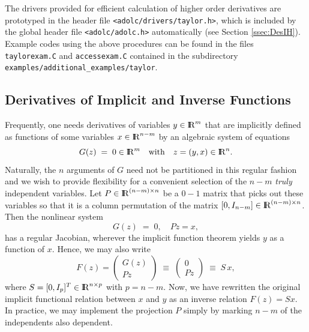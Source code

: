 \documentclass[11pt,twoside]{article}
\newcommand{\R}{{ {\rm I} \kern -.225em {\rm R} }}
\begin{document}
The drivers provided for efficient calculation of higher order
derivatives are prototyped in the header file \verb=<adolc/drivers/taylor.h>=,
which is included by the global header file \verb=<adolc/adolc.h>= automatically
(see Section \ref{ssec:DesIH}).
Example codes using the above procedures can be found in the files
\verb=taylorexam.C= and \verb=accessexam.C= contained in the subdirectory
\verb=examples/additional_examples/taylor=.
%
\subsection{Derivatives of Implicit and Inverse Functions}
\label{implicitInverse}
%
Frequently, one needs derivatives of variables
$y \in \R^{m}$ that are implicitly defined as
functions of some variables $x \in \R^{n-m}$
by an algebraic system of equations
\[
G(z) \; = \; 0 \in \R^m \quad
{\rm with} \quad z = (y, x) \in \R^n .
\] 
Naturally, the $n$ arguments of $G$ need not be partitioned in
this regular fashion and we wish to provide flexibility for a
convenient selection of the $n-m$ {\em truly} independent
variables. Let $P \in \R^{(n-m)\times n}$ be a $0-1$ matrix
that picks out these variables so that it is a column
permutation of the matrix $[0,I_{n-m}] \in \R^{(n-m)\times n}$.
Then the nonlinear system
\[
  G(z) \; = \; 0, \quad P z =  x,                           
\] 
has a regular Jacobian, wherever the implicit function theorem
yields $y$ as a function of $x$. Hence, we may also write
\begin{equation}
\label{eq:inv_tensor}
F(z) = \left(\begin{array}{c}
                        G(z) \\
                        P z
                      \end{array} \right)\; \equiv \;
                \left(\begin{array}{c}
                        0 \\
                        P z
                      \end{array} \right)\; \equiv \; S\, x,
\end{equation}
where $S = [0,I_p]^{T} \in \R^{n \times p}$ with $p=n-m$. Now, we have rewritten
the original implicit functional relation between $x$ and $y$ as an inverse
relation $F(z) = Sx$. In practice, we may implement the projection $P$ simply
by marking $n-m$ of the independents also dependent.  
\end{document}
